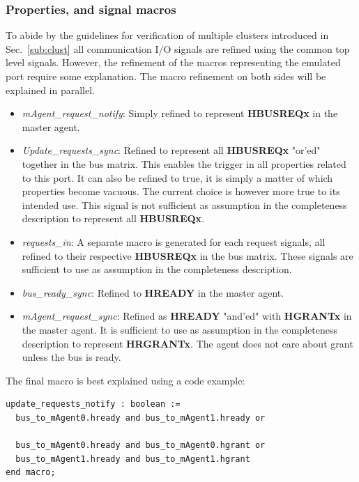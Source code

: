 \subsubsection{Properties, and signal macros}
To abide by the guidelines for verification of multiple clusters introduced in Sec.~\ref{sub:clust} all communication I/O signals are refined using the common
top level signals. However, the refinement of the macros representing the emulated port require some explanation. The macro refinement on both sides will be explained in parallel. 
\begin{itemize}
 \item \textit{mAgent\_request\_notify}: Simply refined to represent \textbf{HBUSREQx} in the master agent.
 \item \textit{Update\_requests\_sync}: Refined to represent all \textbf{HBUSREQx} "or'ed" together in the bus matrix. This enables the trigger in all properties related to this port. It can also be refined to true, it is simply a matter of which properties become vacuous. The current choice is however more true to its intended use. This signal is not sufficient as assumption in the completeness description to represent all \textbf{HBUSREQx}.
 \item \textit{requests\_in}: A separate macro is generated for each request signals, all refined to their respective \textbf{HBUSREQx} in the bus matrix. These signals are sufficient to use as assumption in the completeness description.  
 \item \textit{bus\_ready\_sync}: Refined to \textbf{HREADY} in the master agent. 
 \item \textit{mAgent\_request\_sync}: Refined as \textbf{HREADY} "and'ed" with \textbf{HGRANTx} in the master agent. It is sufficient to use as assumption in the completeness description to represent \textbf{HRGRANTx}. The agent does not care about grant unless the bus is ready. 
\end{itemize} 

The final macro is best explained using a code example:\\
\begin{lstlisting}
update_requests_notify : boolean := 
  bus_to_mAgent0.hready and bus_to_mAgent1.hready or
  
  bus_to_mAgent0.hready and bus_to_mAgent0.hgrant or
  bus_to_mAgent1.hready and bus_to_mAgent1.hgrant
end macro;
\end{lstlisting}



